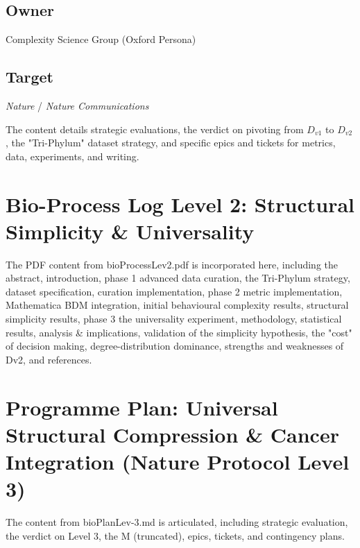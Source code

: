 \documentclass{article}
\begin{document}
\subsection{Owner}
Complexity Science Group (Oxford Persona)

\subsection{Target}
\textit{Nature} / \textit{Nature Communications}

The content details strategic evaluations, the verdict on pivoting from $D_{v1}$ to $D_{v2}$, the "Tri-Phylum" dataset strategy, and specific epics and tickets for metrics, data, experiments, and writing.

\section{Bio-Process Log Level 2: Structural Simplicity \& Universality}
The PDF content from bioProcessLev2.pdf is incorporated here, including the abstract, introduction, phase 1 advanced data curation, the Tri-Phylum strategy, dataset specification, curation implementation, phase 2 metric implementation, Mathematica BDM integration, initial behavioural complexity results, structural simplicity results, phase 3 the universality experiment, methodology, statistical results, analysis \& implications, validation of the simplicity hypothesis, the "cost" of decision making, degree-distribution dominance, strengths and weaknesses of Dv2, and references.

\section{Programme Plan: Universal Structural Compression \& Cancer Integration (Nature Protocol Level 3)}
The content from bioPlanLev-3.md is articulated, including strategic evaluation, the verdict on Level 3, the M (truncated), epics, tickets, and contingency plans.
\end{document}
